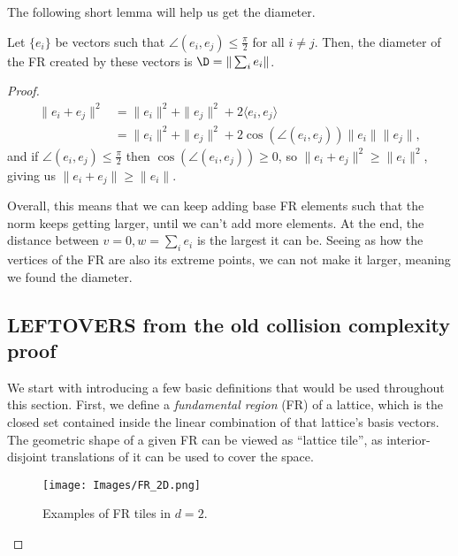     The following short lemma will help us get the diameter.
\begin{lemma}\label{lemma:diameter}
    Let $\{e_i\}$ be vectors such that $\angle\left(e_i,e_j\right)\leq \frac{\pi}{2}$ for all $i\neq j$. Then, the diameter of the FR created by these vectors is $\D=\|\sum_i e_i\|$.
\end{lemma}
\begin{proof}
    \begin{align*}
        \|e_i+e_j\|^2&= \|e_i\|^2+\|e_j\|^2+2\langle e_i,e_j \rangle \\
        &= \|e_i\|^2+\|e_j\|^2+2\cos{\left(\angle\left(e_i,e_j\right)\right)}\|e_i\|\|e_j\|,
    \end{align*}
    and if $\angle\left(e_i,e_j\right)\leq \frac{\pi}{2}$ then $\cos{\left(\angle\left(e_i,e_j\right)\right)}\geq 0$, so \(\|e_i+e_j\|^2 \geq \|e_i\|^2\), giving us \(\|e_i+e_j\| \geq \|e_i\|\).
    
    
    Overall, this means that we can keep adding base FR elements such that the norm keeps getting larger, until we can't add more elements. At the end, the distance between $v=0,w=\sum_i e_i$ is the largest it can be. Seeing as how the vertices of the FR are also its extreme points, we can not make it larger, meaning we found the diameter.
\subsection{LEFTOVERS from the old collision complexity proof}
We start with introducing a few basic definitions that would be used throughout this section. First, we define a \emph{fundamental region} (FR) of a lattice, which is the closed set contained inside the linear combination of that lattice's basis vectors. The geometric shape of a given FR can be viewed as ``lattice tile'', as interior-disjoint translations of it can be used to cover the space. 


 \begin{figure}
    \centering
    \texttt{[image: Images/FR\_2D.png]}
    \caption{Examples of FR tiles in $d=2$.  }
    \label{fig:reflection}
\end{figure}


\end{proof}
